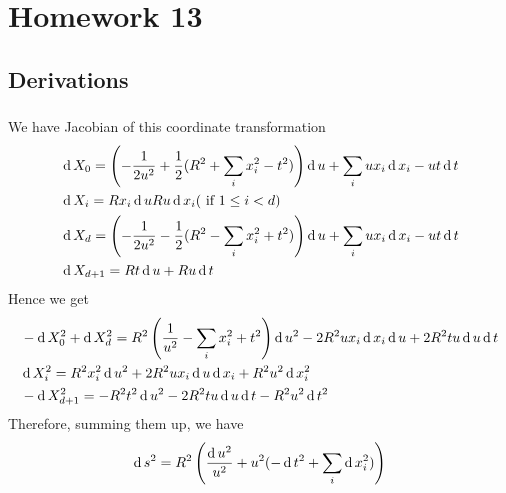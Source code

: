\newpage
\section{Homework 13}
\subsection{Derivations}
\subsubsection{}
\subsubsection{}
We have Jacobian of this coordinate transformation
\begin{equation}
	\begin{split}
	&\operatorname{d} X_0 =  \left(-\frac{1}{2u^2} + \frac{1}{2} (R^2 +\sum_i x_i^2 -t^2) \right)\operatorname{d} u + \sum_i ux_i \operatorname{d} x_i - ut \operatorname{d} t\\
	&\operatorname{d} X_i = R x_i \operatorname{d} u R u \operatorname{d} x_i \text{( if } 1 \leq i < d \text{)}\\
	&\operatorname{d} X_d =\left(-\frac{1}{2u^2} - \frac{1}{2} (R^2 - \sum_i x^2_i +t^2) \right) \operatorname{d} u + \sum_i ux_i \operatorname{d} x_i - ut \operatorname{d} t\\
	&\operatorname{d} X_{d+1} = Rt \operatorname{d} u + R u \operatorname{d} t
	\end{split}
\end{equation}
Hence we get 
\begin{equation}
	\begin{split}
	&-\operatorname{d} X_0^2 + \operatorname{d} X_d^2 = R^2 \left( \frac{1}{u^2} - \sum_i x_i^2 + t^2\right)\operatorname{d} u^2 - 2R^2 u x_i \operatorname{d} x_i \operatorname{d} u +2R^2 t u \operatorname{d} u \operatorname{d} t\\
	& \operatorname{d} X_i^2 = R^2 x_i^2 \operatorname{d} u^2 + 2 R^2 ux_i \operatorname{d} u \operatorname{d} x_i + R^2 u^2 \operatorname{d} x_i^2\\
	& - \operatorname{d} X_{d+1}^2 = - R^2 t^2 \operatorname{d} u^2 - 2 R^2 tu \operatorname{d} u \operatorname{d} t - R^2 u^2 \operatorname{d} t^2
	\end{split}
\end{equation}
Therefore, summing them up, we have 
\begin{equation}
	\operatorname{d} s^2 = R^2 \left( \frac{\operatorname{d} u^2}{u^2} + u^2 (-\operatorname{d} t^2 + \sum_i \operatorname{d} x_i^2)\right)
\end{equation}
